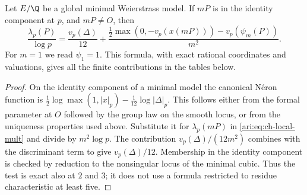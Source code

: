 \begin{proposition}\label{ari:C.6.2}
Let $E/\Q$ be a global minimal Weierstrass model. If $mP$ is
in the identity component at $p$, and $mP\ne O$, then
\begin{equation}\label{ari:eq:ch-local-exact}
 \frac{\lambda_p(P)}{\log p}
 =\frac{v_p(\Delta)}{12}
   +\frac{\frac12\max(0,-v_p(x(mP)))-v_p(\psi_m(P))}{m^2}.
\end{equation}
For $m=1$ we read $\psi_1=1$. This formula, with exact rational
coordinates and valuations, gives all the finite contributions
in the tables below.
\end{proposition}
\begin{proof}
On the identity component of a minimal model the canonical
N\'eron function is
$\frac12\log\max(1,|x|_p)-\frac1{12}\log|\Delta|_p$.
This follows either from the formal parameter at $O$ followed
by the group law on the smooth locus, or from the uniqueness
properties used above. Substitute it for $\lambda_p(mP)$ in
\eqref{ari:eq:ch-local-mult} and divide by $m^2\log p$.
The contribution $v_p(\Delta)/(12m^2)$ combines with the
discriminant term to give $v_p(\Delta)/12$.
Membership in the identity component is checked by reduction
to the nonsingular locus of the minimal cubic. Thus the test is
exact also at $2$ and $3$; it does not use a formula restricted
to residue characteristic at least five.
\end{proof}

